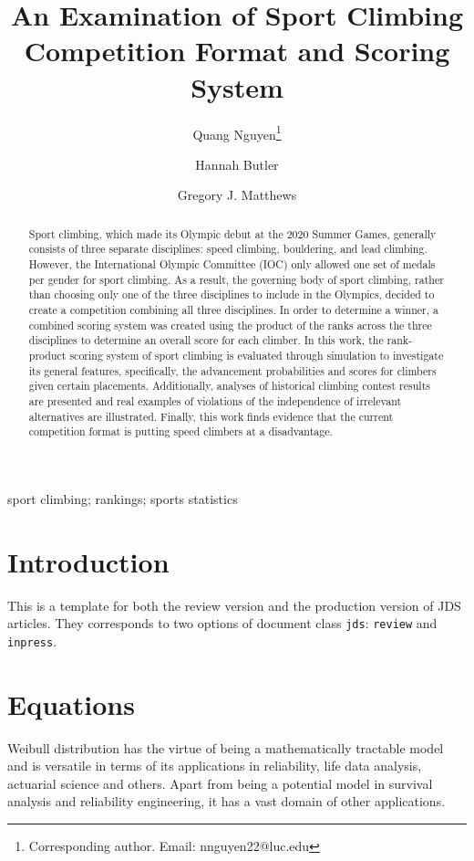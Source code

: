 \documentclass[letterpaper, inpress]{jds} %
\title[An Examination of Sport Climbing Competition Format and Scoring System]{An Examination of Sport Climbing Competition Format and Scoring System}
\author[1]{Quang Nguyen\footnote{Corresponding author. Email: nnguyen22@luc.edu}}
\author[2]{Hannah Butler}
\author[1]{Gregory J. Matthews}
\affil[1]{Department of Mathematics and Statistics, Loyola University Chicago, Chicago, IL, USA}
\affil[2]{Department of Statistics, Colorado State University, Fort Collins, CO, USA}
\begin{document}
\maketitle

\begin{abstract}
Sport climbing, which made its Olympic debut at the 2020 Summer Games, generally consists of three separate disciplines: speed climbing, bouldering, and lead climbing. However, the International Olympic Committee (IOC) only allowed one set of medals per gender for sport climbing. As a result, the governing body of sport climbing, rather than choosing only one of the three disciplines to include in the Olympics, decided to create a competition combining all three disciplines. In order to determine a winner, a combined scoring system was created using the product of the ranks across the three disciplines to determine an overall score for each climber. In this work, the rank-product scoring system of sport climbing is evaluated through simulation to investigate its general features, specifically, the advancement probabilities and scores for climbers given certain placements. Additionally, analyses of historical climbing contest results are presented and real examples of violations of the independence of irrelevant alternatives are illustrated. Finally, this work finds evidence that the current competition format is putting speed climbers at a disadvantage.\@
\end{abstract}

\begin{keywords} %
sport climbing; rankings; sports statistics
\end{keywords}

\section{Introduction}%
\label{sec:intro}

This is a template for both the review version and the production
version of JDS articles. They corresponds to two options of document
class \texttt{jds}: \texttt{review} and \texttt{inpress}.


\lipsum[1-2]


\section{Equations}%
\label{sec:eq}


Weibull distribution has the virtue of being a mathematically tractable model
and is versatile in terms of its applications in reliability, life data
analysis, actuarial science and others. Apart from being a potential model in
survival analysis and reliability engineering, it has a vast domain of other
applications.
\end{document}
